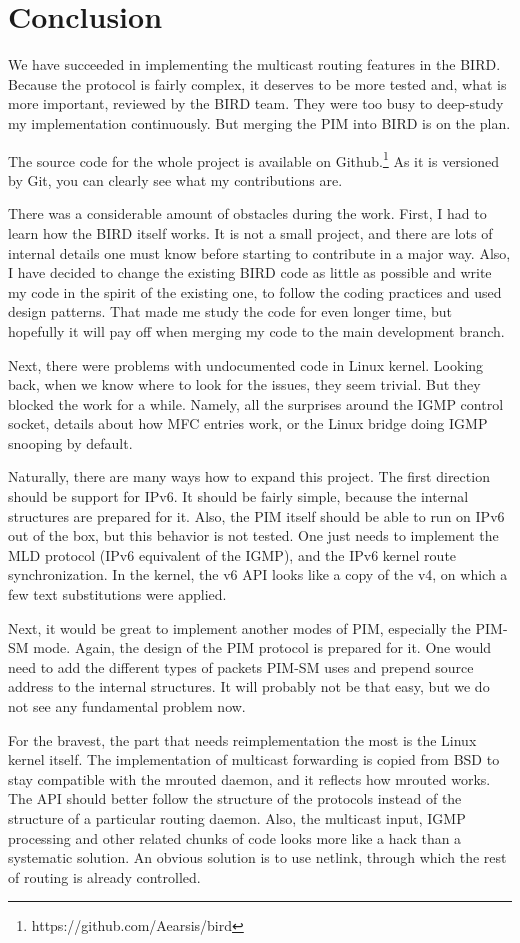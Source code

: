 \chapter*{Conclusion}

We have succeeded in implementing the multicast routing features in the BIRD.
Because the protocol is fairly complex, it deserves to be more tested and, what
is more important, reviewed by the BIRD team. They were too busy to deep-study
my implementation continuously. But merging the PIM into BIRD is on the plan.

The source code for the whole project is available on Github.\footnote{https://github.com/Aearsis/bird}
As it is versioned by Git, you can clearly see what my contributions are.

There was a considerable amount of obstacles during the work. First, I had to
learn how the BIRD itself works. It is not a small project, and there are lots
of internal details one must know before starting to contribute in a major way.
Also, I have decided to change the existing BIRD code as little as possible and
write my code in the spirit of the existing one, to follow the coding practices
and used design patterns. That made me study the code for even longer time, but
hopefully it will pay off when merging my code to the main development branch.

Next, there were problems with undocumented code in Linux kernel. Looking back,
when we know where to look for the issues, they seem trivial. But they blocked
the work for a while. Namely, all the surprises around the IGMP control socket,
details about how MFC entries work, or the Linux bridge doing IGMP snooping by
default.

Naturally, there are many ways how to expand this project. The first direction
should be support for IPv6. It should be fairly simple, because the internal
structures are prepared for it. Also, the PIM itself should be able to run on
IPv6 out of the box, but this behavior is not tested. One just needs to
implement the MLD protocol (IPv6 equivalent of the IGMP), and the IPv6 kernel
route synchronization. In the kernel, the v6 API looks like a copy of the v4,
on which a few text substitutions were applied.

Next, it would be great to implement another modes of PIM, especially the PIM-SM mode.
Again, the design of the PIM protocol is prepared for it. One would need to
add the different types of packets PIM-SM uses and prepend source address to
the internal structures. It will probably not be that easy, but we do not see
any fundamental problem now.

For the bravest, the part that needs reimplementation the most is the Linux
kernel itself. The implementation of multicast forwarding is copied from BSD to
stay compatible with the mrouted daemon, and it reflects how mrouted works.
The API should better follow the structure of the protocols instead of the
structure of a particular routing daemon. Also, the multicast input, IGMP
processing and other related chunks of code looks more like a hack than
a systematic solution. An obvious solution is to use netlink, through which the
rest of routing is already controlled.
